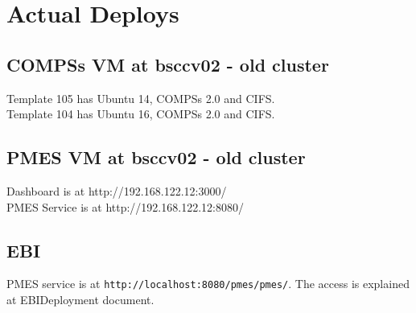 \documentclass[a4paper,10pt]{article}
\begin{document}
\section{Actual Deploys}
\subsection{COMPSs VM at bsccv02 - old cluster}
Template 105 has Ubuntu 14, COMPSs 2.0 and CIFS.\\
Template 104 has Ubuntu 16, COMPSs 2.0 and CIFS.

\subsection{PMES VM at bsccv02 - old cluster}
Dashboard is at http://192.168.122.12:3000/ \\
PMES Service is at http://192.168.122.12:8080/ \\

\subsection{EBI}
PMES service is at \texttt{http://localhost:8080/pmes/pmes/}. The access is explained at EBIDeployment document.
\end{document}
